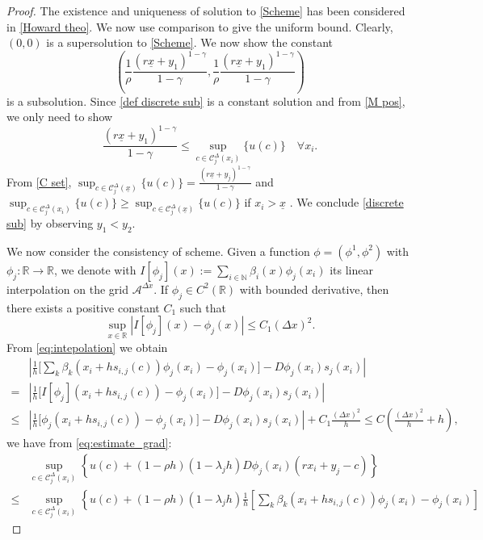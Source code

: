 \documentclass[11pt]{article}
\numberwithin{equation}{section}
\theoremstyle{Claim}
\newcommand{\R}{\mathbb{R}}
\newcommand{\N}{\mathbb{N}}
\newcommand{\mA}{\mathcal A}
\newcommand{\mC}{\mathcal C}
\newcommand{\ux}{{\underline x}}
\newcommand{\beq}{\begin{equation}}
\newcommand{\eeq}{\end{equation}}
\theoremstyle{plain}
\newcommand{\D}{\Delta}
\newcommand{\Dx}{{\Delta x}}
\begin{document}
\begin{proof}
The existence and uniqueness of solution to \cref{Scheme} has been considered in \cref{Howard theo}. We now use comparison to give the uniform bound. Clearly, $(0,0)$ is a supersolution to \cref{Scheme}. We now show the constant
\beq\label{def discrete sub}
\left(\frac{1}{\rho}\frac{(r\ux+y_1)^{1-\gamma}}{1-\gamma},\frac{1}{\rho}\frac{(r\ux+y_1)^{1-\gamma}}{1-\gamma}\right)
\eeq
 is a subsolution. Since \cref{def discrete sub} is a constant solution and from \cref{M pos}, we only need to show
\beq\label{discrete sub}
\frac{(r\ux+y_1)^{1-\gamma}}{1-\gamma}\leq \sup_{c\in \mC^{\D}_{j}(x_i)}\{u(c)\}\quad \forall x_i.
\eeq
From \cref{C set}, $\sup_{c\in \mC^{\D}_{j}(\ux)}\{u(c)\}=\frac{(r\ux+y_j)^{1-\gamma}}{1-\gamma}$ and $\sup_{c\in \mC^{\D}_{j}(x_i)}\{u(c)\}\geq \sup_{c\in \mC^{\D}_{j}(\ux)}\{u(c)\}$ if $x_i>\ux$ . We conclude \cref{discrete sub} by observing $y_1<y_2$.  \par
We now consider the consistency of scheme.  Given a  function $\phi=(\phi^1,\phi^2)$ with $\phi_{j}:\R\to\R$, we denote with 
$
	I[\phi_{j}](x):=\sum_{i\in  \N} \beta_i(x) \phi_{j} (x_i) 
$
its linear interpolation on the grid $\mA^\Dx$. If $\phi_{j}\in C^2(\R)$ with bounded derivative, then there exists a positive constant $C_1$ such that
\begin{equation}\label{eq:intepolation} 
	\sup_{x\in \R}| I[ \phi_{j}](x)-\phi_{j}(x)|\le C_1(\Dx)^2.
\end{equation} 
From \eqref{eq:intepolation} we obtain
\begin{equation}\label{eq:estimate_grad}
	\begin{split}
		& \left|\frac{1}{h} \big[ \sum_k \beta_k(x_i+hs_{i,j}(c))\phi_{j}(x_i)-\phi_{j}(x_i)]-D\phi_{j}(x_i)s_j(x_i)\right|\\
		=& \left|\frac{1}{h} \big[I[ \phi_{j}](x_i+hs_{i,j}(c))-\phi_{j}(x_i)\big]-D\phi_{j}(x_i)s_j(x_i)\right| \\
\le &\left|\frac{1}{h}  \big[\phi_{j}(x_i+hs_{i,j}(c))-\phi_{j}(x_i)\big]-D\phi_{j}(x_i)s_j(x_i)\right| +	C_1\frac{(\Dx)^2}{h}
\le C\left(\frac{(\Dx)^2}{h}+h\right),
	\end{split}
\end{equation}
we have from \cref{eq:estimate_grad}:
\begin{align*}
&\sup_{c\in \mC^{\D}_{j}(x_i)}\left\{
	u(c)+(1-\rho h)(1-\lambda_jh)D\phi_{j}(x_i)(rx_i+y_j-c)
	\right\}\\
\leq {}&\sup_{c\in \mC^{\D}_{j}(x_i)}\left\{
	u(c)+(1-\rho h)(1-\lambda_jh)\frac{1}{h} \left[ \sum_k \beta_k\left(x_i+hs_{i,j}(c)\right)\phi_{j}(x_i)-\phi_{j}(x_i)\right] 

\end{align*}
\end{proof}
\end{document}

